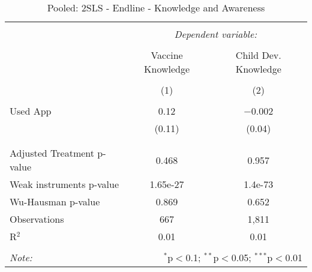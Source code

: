 
\begin{table}[!htbp] \centering 
  \caption{Pooled: 2SLS - Endline - Knowledge and Awareness} 
  \label{tbl:Pooled: 2SLS - Endline - Knowledge and Awareness} 
\begin{tabular}{@{\extracolsep{5pt}}lcc} 
\\[-1.8ex]\hline 
\hline \\[-1.8ex] 
 & \multicolumn{2}{c}{\textit{Dependent variable:}} \\ 
\cline{2-3} 
\\[-1.8ex] & Vaccine Knowledge & Child Dev. Knowledge \\ 
\\[-1.8ex] & (1) & (2)\\ 
\hline \\[-1.8ex] 
 Used App & 0.12 & $-$0.002 \\ 
  & (0.11) & (0.04) \\ 
  & & \\ 
\hline \\[-1.8ex] 
Adjusted Treatment p-value & 0.468 & 0.957 \\ 
Weak instruments p-value & 1.65e-27 & 1.4e-73 \\ 
Wu-Hausman p-value & 0.869 & 0.652 \\ 
Observations & 667 & 1,811 \\ 
R$^{2}$ & 0.01 & 0.01 \\ 
\hline 
\hline \\[-1.8ex] 
\textit{Note:}  & \multicolumn{2}{r}{$^{*}$p$<$0.1; $^{**}$p$<$0.05; $^{***}$p$<$0.01} \\ 
\end{tabular} 
\end{table} 
